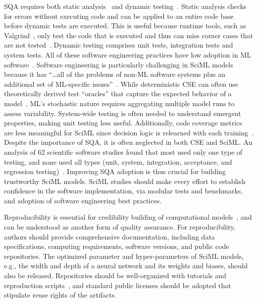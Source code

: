 SQA requires both static analysis~\cite{Louridas_IEEES_2006,Fatima_BH_book_2018} and dynamic testing~\cite{Jamil_ANA_ICT4M_2016}.  
Static analysis checks for errors without executing code and can be applied to an entire code base before dynamic tests are executed.
This is useful because runtime tools, such as Valgrind~\cite{Valgrind_2007}, only test the code that is executed and thus can miss corner cases that are not tested~\cite{Gulabovska_P_IEEE_2019}.
Dynamic testing comprises unit tests, integration tests and system tests.
All of these software engineering practices have low adoption in ML software~\cite{Seban_BHV_ACM_2020}.
Software engineering is particularly challenging in SciML models because it has ``\ldots all of the problems of non-ML software systems plus an additional set of ML-specific issues''~\cite{Wan_IEEE_XLM_2021}.
While deterministic CSE can often use theoretically derived test ``oracles'' that capture the expected behavior of a model~\cite{Johanson_H_CSE_2018}, ML's stochastic nature requires aggregating multiple model runs to assess variability.
System-wide testing is often needed to understand emergent properties, making unit testing less useful.
Additionally, code coverage metrics are less meaningful for SciML since decision logic is relearned with each training~\cite{Zhang_HML_IEEE_TSE_2022}.
Despite the importance of SQA, it is often neglected in both CSE and SciML. An analysis of 62 scientific software studies found that most used only one type of testing, and none used all types (unit, system, integration, acceptance, and regression testing)~\cite{Kanewala_B_IST_2014}. 
Improving SQA adoption is thus crucial for building trustworthy SciML models.
SciML studies should make every effort to establish confidence in the software implementation, via modular tests and benchmarks, and adoption of software engineering best practices. 

Reproducibility is essential for credibility building of computational models~\cite{nasem_2019}, and can be understood as another form of quality assurance. 
For reproducibility, authors should provide comprehensive documentation, including data specifications, computing requirements, software versions, and public code repositories. The optimized parameter and hyper-parameters of SciML models, e.g., the width and depth of a neural network and its weights and biases, should also be released. Repositories should be well-organized with tutorials and reproduction scripts~\cite{Kapoor_et_al_SA_2024}, and standard public licenses should be adopted that stipulate reuse rights of the artifacts. 

